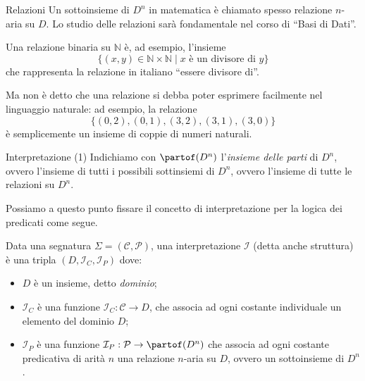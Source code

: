 \documentclass[aspectratio=169,10pt,dvipsnames,xcolor=table,handout]{beamer}
\newcommand{\mcI}{\mathcal{I}}
\newcommand{\mc}{\mathcal}
\begin{document}
\begin{frame}{Relazioni}
    Un sottoinsieme di $D^n$ in matematica è chiamato spesso \alert{relazione} $n$-aria su $D$. Lo studio delle relazioni sarà fondamentale nel corso di ``Basi di Dati''.

    \begin{example}
        Una relazione binaria su $\mathbb N$ è,  ad esempio, l'insieme
        \[
            \{ (x, y) \in \mathbb N \times \mathbb N \mid x \text{ è un divisore di } y \}
        \]
        che rappresenta la relazione in italiano ``essere divisore di''.

        \medskip
        Ma non è detto che una relazione si debba poter esprimere facilmente nel linguaggio naturale: ad esempio, la relazione
        \[
            \{ (0,2), (0,1), (3, 2), (3, 1), (3, 0) \}
        \]
        è semplicemente un insieme di coppie di numeri naturali.
    \end{example}
\end{frame}

\begin{frame}{Interpretazione (1)}
    Indichiamo con  $\partof(D^n)$ l'\emph{insieme delle parti} di $D^n$, ovvero l'insieme di tutti i possibili sottinsiemi di $D^n$, ovvero l'insieme di tutte le relazioni su $D^n$.
    \medskip

    Possiamo a questo punto fissare il concetto di interpretazione per la logica dei predicati come segue.

    \begin{definition}
        Data una segnatura $\Sigma= (\mc C, \mc P)$, una \alert{interpretazione} $\mcI$ (detta anche \alert{struttura}) è una tripla $(D, \mc I_C, \mc I_P )$ dove:
        \begin{itemize}
            \item $D$ è un insieme, detto \emph{dominio};
            \item $\mc I_C$ è una funzione  $\mcI_C: \mc C \to D$, che associa ad ogni costante individuale un elemento del dominio $D$;
            \item $\mc I_P$ è una funzione  $\mcI_P: \mc P \to \partof(D^n)$ che associa ad ogni costante predicativa di arità $n$ una relazione $n$-aria su $D$, ovvero un sottoinsieme di $D^n$.
        \end{itemize}
    \end{definition}
\end{frame}
\end{document}
